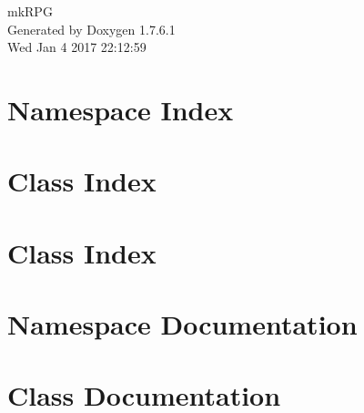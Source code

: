 \documentclass[a4paper]{book}
\begin{document}
\hypersetup{pageanchor=false,citecolor=blue}
\begin{titlepage}
\vspace*{7cm}
\begin{center}
{\Large mk\-R\-P\-G }\\
\vspace*{1cm}
{\large \-Generated by Doxygen 1.7.6.1}\\
\vspace*{0.5cm}
{\small Wed Jan 4 2017 22:12:59}\\
\end{center}
\end{titlepage}
\clearemptydoublepage
{}
\tableofcontents
\clearemptydoublepage
{}
\hypersetup{pageanchor=true,citecolor=blue}
\chapter{\-Namespace \-Index}

\chapter{\-Class \-Index}

\chapter{\-Class \-Index}

\chapter{\-Namespace \-Documentation}















\chapter{\-Class \-Documentation}



























\printindex
\end{document}
